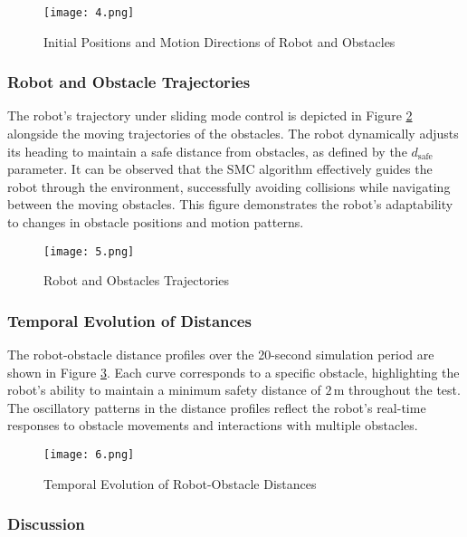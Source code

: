 \begin{figure}[H]
    \centering
    \texttt{[image: 4.png]}
    \caption{Initial Positions and Motion Directions of Robot and Obstacles}
    \label{FIG:4}
\end{figure}

\subsubsection{Robot and Obstacle Trajectories}

The robot's trajectory under sliding mode control is depicted in Figure \ref{FIG:5} alongside the moving trajectories of the obstacles. The robot dynamically adjusts its heading to maintain a safe distance from obstacles, as defined by the \(d_{\text{safe}}\) parameter. It can be observed that the SMC algorithm effectively guides the robot through the environment, successfully avoiding collisions while navigating between the moving obstacles. This figure demonstrates the robot's adaptability to changes in obstacle positions and motion patterns.

\begin{figure}[H]
    \centering
    \texttt{[image: 5.png]}
    \caption{Robot and Obstacles Trajectories}
    \label{FIG:5}
\end{figure}

\subsubsection{Temporal Evolution of Distances}

The robot-obstacle distance profiles over the 20-second simulation period are shown in Figure \ref{FIG:6}. Each curve corresponds to a specific obstacle, highlighting the robot's ability to maintain a minimum safety distance of \(2\,\text{m}\) throughout the test. The oscillatory patterns in the distance profiles reflect the robot's real-time responses to obstacle movements and interactions with multiple obstacles.

\begin{figure}[H]
    \centering
    \texttt{[image: 6.png]}
    \caption{Temporal Evolution of Robot-Obstacle Distances}
    \label{FIG:6}
\end{figure}

\subsubsection{Discussion}

